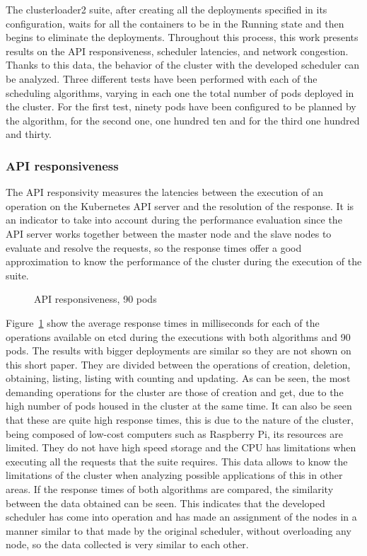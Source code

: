 \documentclass[conference]{IEEEtran}
\begin{document}
The clusterloader2 suite, after creating all the deployments specified in its configuration, waits for all the containers to be in the Running state and then begins to eliminate the deployments. Throughout this process, this work presents results on the API responsiveness, scheduler latencies, and network congestion. Thanks to this data, the behavior of the cluster with the developed scheduler can be analyzed. Three different tests have been performed with each of the scheduling algorithms, varying in each one the total number of pods deployed in the cluster. For the first test, ninety pods have been configured to be planned by the algorithm, for the second one, one hundred ten and for the third one hundred and thirty.


\subsubsection{API responsiveness}\label{sec:apiresp}

The API responsivity measures the latencies between the execution of an operation on the Kubernetes API server and the resolution of the response. It is an indicator to take into account during the 
performance evaluation since the API server works together between the master node and the slave nodes to evaluate and resolve the requests, so the response times offer a good approximation to know the 
performance of the cluster during the execution of the suite.

\begin{figure}[h]
\begin{center}
\strut{}
\caption{API responsiveness, 90 pods}\label{fig:api}
\end{center}
\end{figure}

Figure~\ref{fig:api} show the average response times in milliseconds for each of the operations available on etcd during the executions with both algorithms and 90 pods. The results with bigger deployments are similar so they are not shown on this short paper. They are divided between the operations of creation, deletion, obtaining, listing, listing with counting and updating. As can be seen, the most demanding operations for the cluster are those of creation and get, due to the high number of pods housed in the cluster at the same time. It can also be seen that these are quite high response times, this is due to the nature of the cluster, being composed of low-cost computers such as Raspberry Pi, its resources are limited. They do not have high speed storage and the CPU has limitations when executing all the requests that the suite requires. This data allows to know the limitations of the cluster when analyzing possible applications of this in other areas. If the response times of both algorithms are compared, the similarity between the data obtained can be seen. This indicates that the developed scheduler has come into operation and has made an assignment of the nodes in a manner similar to that made by the original scheduler, without overloading any node, so the data collected is very similar to each other.
\end{document}
